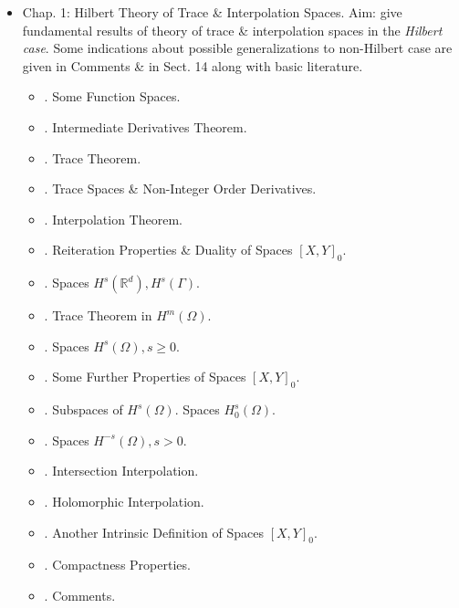 \documentclass{article}
\begin{document}
\begin{enumerate}
	\begin{itemize}
		\item {\sf Chap. 1: Hilbert Theory of Trace \& Interpolation Spaces.} Aim: give fundamental results of theory of trace \& interpolation spaces in the {\it Hilbert case}. Some indications about possible generalizations to non-Hilbert case are given in Comments \& in Sect. 14 along with basic literature.
		\begin{itemize}
			\item {. Some Function Spaces.}
			\item {. Intermediate Derivatives Theorem.}
			\item {. Trace Theorem.}
			\item {. Trace Spaces \& Non-Integer Order Derivatives.}
			\item {. Interpolation Theorem.}
			\item {. Reiteration Properties \& Duality of Spaces $[X,Y]_0$.}
			\item {. Spaces $H^s(\mathbb{R}^d),H^s(\Gamma)$.}
			\item {. Trace Theorem in $H^m(\Omega)$.}
			\item {. Spaces $H^s(\Omega),s\ge0$.}
			\item {. Some Further Properties of Spaces $[X,Y]_0$.}
			\item {. Subspaces of $H^s(\Omega)$. Spaces $H_0^s(\Omega)$.}
			\item {. Spaces $H^{-s}(\Omega),s > 0$.}
			\item {. Intersection Interpolation.}
			\item {. Holomorphic Interpolation.}
			\item {. Another Intrinsic Definition of Spaces $[X,Y]_0$.}
			\item {. Compactness Properties.}
			\item {. Comments.}
		\end{itemize}
		

\end{itemize}
\end{enumerate}
\end{document}
